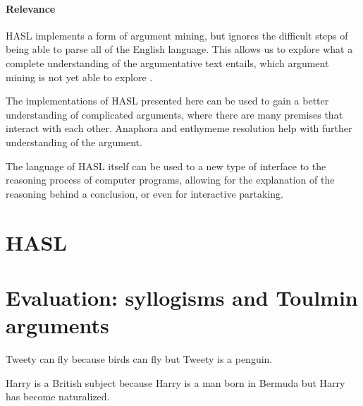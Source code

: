 \documentclass{IOS-Book-Article}
\begin{document}
\paragraph{Relevance}
HASL implements a form of argument mining, but ignores the difficult steps of being able to parse all of the English language. This allows us to explore what a complete understanding of the argumentative text entails, which argument mining is not yet able to explore \cite{stabGurevych2017}.

The implementations of HASL presented here can be used to gain a better understanding of complicated arguments, where there are many premises that interact with each other. Anaphora and enthymeme resolution help with further understanding of the argument.

The language of HASL itself can be used to a new type of interface to the reasoning process of computer programs, allowing for the explanation of the reasoning behind a conclusion, or even for interactive partaking.

\section{HASL}


\section{Evaluation: syllogisms and Toulmin arguments}

\begin{exe}
	\ex Tweety can fly because birds can fly but Tweety is a penguin.

	\ex Harry is a British subject because Harry is a man born in Bermuda but Harry has become naturalized.
\end{exe}
\end{document}
